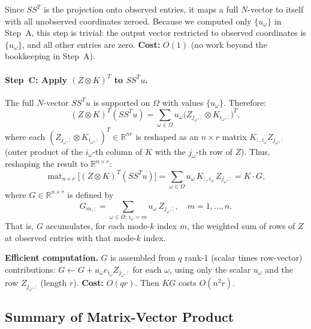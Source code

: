 \documentclass[12pt]{article}
\theoremstyle{definition}
\DeclareMathOperator{\mat}{mat}
\begin{document}
Since $SS^T$ is the projection onto observed entries, it maps a full $N$-vector to itself with
all unobserved coordinates zeroed.  Because we computed only $\{u_\omega\}$ in Step~A, this
step is trivial: the output vector restricted to observed coordinates is $\{u_\omega\}$, and
all other entries are zero.  \textbf{Cost:} $O(1)$ (no work beyond the bookkeeping in Step~A).

\paragraph{Step~C: Apply $(Z \otimes K)^T$ to $SS^T u$.}

The full $N$-vector $SS^T u$ is supported on $\Omega$ with values $\{u_\omega\}$.  Therefore:
\begin{equation}
  (Z \otimes K)^T (SS^T u)
  = \sum_{\omega \in \Omega} u_\omega
    \bigl(Z_{j_\omega,:} \otimes K_{i_\omega,:}\bigr)^T,
  \label{eq:step-c}
\end{equation}
where each $(Z_{j_\omega,:} \otimes K_{i_\omega,:})^T \in \mathbb{R}^{nr}$ is reshaped as an
$n \times r$ matrix $K_{:,i_\omega} Z_{j_\omega,:}$ (outer product of the $i_\omega$-th column
of $K$ with the $j_\omega$-th row of $Z$).  Thus, reshaping the result to $\mathbb{R}^{n \times r}$:
\[
  \mat_{n \times r}\!\bigl[(Z \otimes K)^T (SS^T u)\bigr]
  = \sum_{\omega \in \Omega} u_\omega\,K_{:,i_\omega}\,Z_{j_\omega,:}
  = K \cdot G,
\]
where $G \in \mathbb{R}^{n \times r}$ is defined by
\begin{equation}
  G_{m,:} = \sum_{\omega \in \Omega:\, i_\omega = m} u_\omega\, Z_{j_\omega,:},
  \quad m = 1, \dots, n.
  \label{eq:G}
\end{equation}
That is, $G$ accumulates, for each mode-$k$ index $m$, the weighted sum of rows of $Z$
at observed entries with that mode-$k$ index.

\textbf{Efficient computation.}
$G$ is assembled from $q$ rank-1 (scalar times row-vector) contributions:
$G \leftarrow G + u_\omega e_{i_\omega} Z_{j_\omega,:}$ for each $\omega$, using only the
scalar $u_\omega$ and the row $Z_{j_\omega,:}$ (length $r$).  \textbf{Cost:} $O(qr)$.
Then $KG$ costs $O(n^2 r)$.

\subsection{Summary of Matrix-Vector Product}
\end{document}
